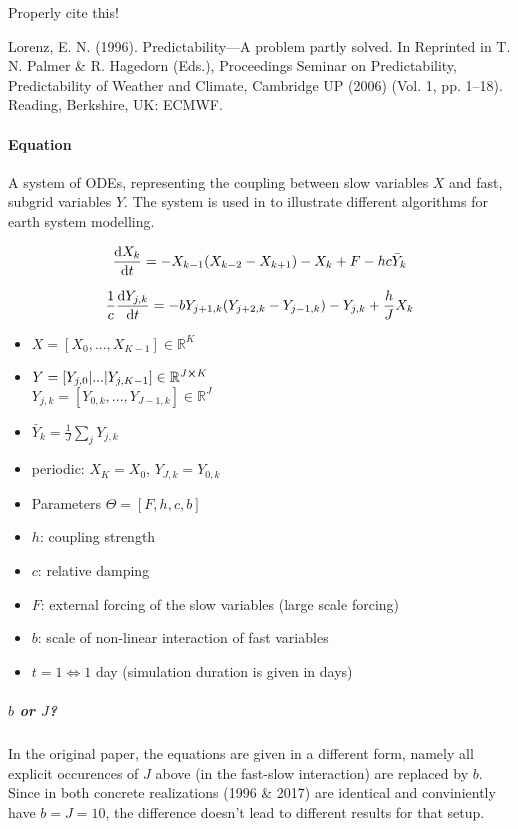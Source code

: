 \documentclass[11pt]{article}
\newcommand{\R}{{\mathbb{R}}}
\begin{document}
Properly cite this!


Lorenz, E. N. (1996). Predictability—A problem partly solved. In Reprinted in T. N. Palmer \& R. Hagedorn (Eds.), Proceedings Seminar on
Predictability, Predictability of Weather and Climate, Cambridge UP (2006) (Vol. 1, pp. 1–18). Reading, Berkshire, UK: ECMWF.

\paragraph{Equation}
\label{sec:orgeb1855a}

A system of ODEs, representing the coupling between slow variables \(X\) and fast, subgrid
variables \(Y\). The system is used in \cite{schneider_earth_2017} to illustrate different
algorithms for earth system modelling.

\begin{equation}
\label{eqn:lorenz_X}
  \dv{X_k}{t} =                 - X_{k-1}(X_{k-2} - X_{k+1}) - X_k + F - hc \bar{Y}_k
\end{equation}

\begin{equation}
\label{eqn:lorenz_Y}
  \frac{1}{c} \dv{Y_{j,k}}{t} = -bY_{j+1,k}(Y_{j+2,k} - Y_{j-1, k}) - Y_{j,k} + \frac{h}{J}X_k
\end{equation}

\begin{itemize}
\item \(X = [X_0, ..., X_{K-1}] \in \R^K\)
\item \(Y = [Y_{j, 0} | ... | Y_{j, K-1}] \in \R^{J \cross K}\) \\
\(Y_{j,k} = [Y_{0,k}, ..., Y_{J-1,k}] \in  \R^J\)
\item \(\bar{Y}_k = \frac{1}{J}\sum_j Y_{j,k}\)
\item periodic: \(X_K = X_0\), \(Y_{J,k} = Y_{0,k}\)
\item Parameters \(\Theta = [F, h, c, b]\)
\item \(h\): coupling strength
\item \(c\): relative damping
\item \(F\): external forcing of the slow variables (large scale forcing)
\item \(b\): scale of non-linear interaction of fast variables
\item \(t = 1 \Leftrightarrow 1\) day (simulation duration is given in days)
\end{itemize}

\subparagraph{\(b\) or \(J\)?}
\label{sec:org65f9f8e}
In the original paper, the equations are given in a different form, namely all
explicit occurences of \(J\) above (in the fast-slow interaction) are replaced by
\(b\). Since in both concrete realizations (1996 \& 2017) are identical and conviniently
have \(b=J=10\), the difference doesn't lead to different results for that setup.
\end{document}

